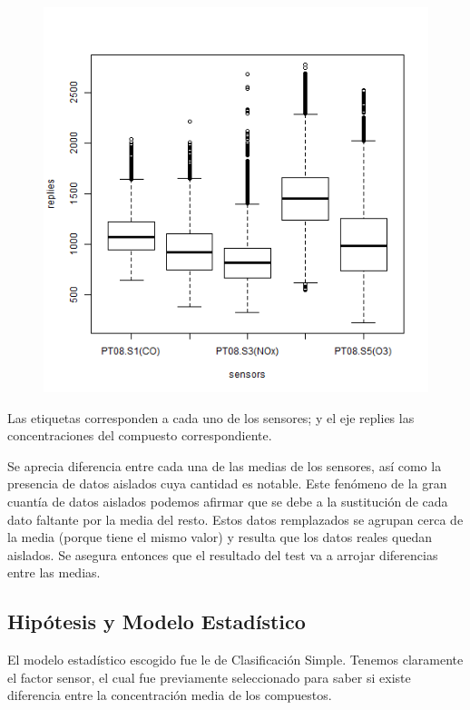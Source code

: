 \documentclass[a4paper,10pt,twocolumn]{article}
\begin{document}
   \begin{figure}[htb]%
  	\begin{center}
  		\includegraphics[width=\linewidth]{Images/boxplot_anova.png}
  	\end{center}
  	\label{fig:Cajas}
  \end{figure}

 Las etiquetas corresponden a cada uno de los sensores; y el eje replies las concentraciones del compuesto correspondiente.

 Se aprecia diferencia entre cada una de las medias de los sensores, así como la presencia de datos aislados cuya cantidad es notable. Este fenómeno de la gran cuantía de datos aislados podemos afirmar que se debe a la sustitución de cada dato faltante por la media del resto. Estos datos remplazados se agrupan cerca de la media (porque tiene el mismo valor) y resulta que los datos reales quedan aislados. Se asegura entonces que el resultado del test va a arrojar diferencias entre las medias.
 
 \subsection{Hipótesis y Modelo Estadístico}
 
 El modelo estadístico escogido fue le de Clasificación Simple. Tenemos claramente el factor
 sensor, el cual fue previamente seleccionado para saber si existe diferencia entre la concentración
 media de los compuestos.
 
\end{document}
